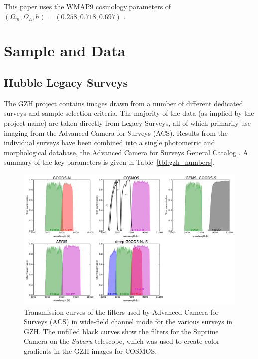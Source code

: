 \documentclass[twocolumn]{aastex6}
\begin{document}
This paper uses the WMAP9 cosmology parameters of $(\Omega_m,\Omega_\Lambda,h)=(0.258,0.718,0.697)$ \citep{hin13}.


\section{Sample and Data}\label{sec:data}

\subsection{Hubble Legacy Surveys}\label{ssec:legacy_surveys}

The GZH project contains images drawn from a number of different dedicated surveys and sample selection criteria. The majority of the data (as implied by the project name) are taken directly from \hst{} Legacy Surveys, all of which primarily use imaging from the Advanced Camera for Surveys (ACS). Results from the individual surveys have been combined into a single photometric and morphological database, the Advanced Camera for Surveys General Catalog \citep[ACS-GC;][]{gri12}. A summary of the key parameters is given in Table~\ref{tbl:gzh_numbers}.

\begin{figure}
\center
\includegraphics[width=160mm]{figures/filter_curves.pdf}
\caption{Transmission curves of the filters used by \hst{} Advanced Camera for Surveys (ACS) in wide-field channel mode for the various surveys in GZH. The unfilled black curves show the filters for the Suprime Camera on the \textit{Subaru} telescope, which was used to create color gradients in the GZH images for COSMOS.\label{fig:filtercurves}}
\end{figure}
\end{document}
